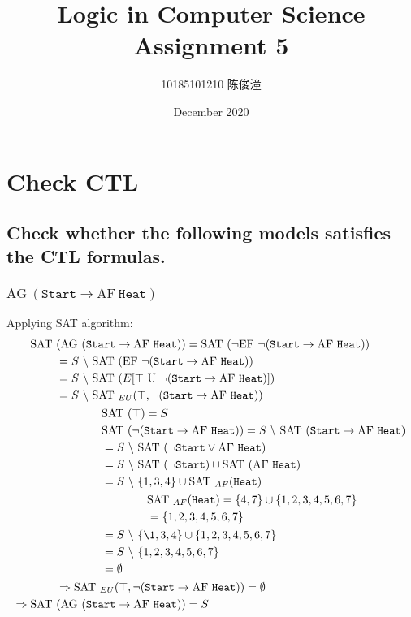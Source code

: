 \documentclass{ctexart}
\title{Logic in Computer Science Assignment 5}
\author{10185101210 陈俊潼}
\date{December 2020}
\def\n{\neg}
\def\SAT{\mathrm{SAT\ }}
\def\AF{\mathrm{AF\ }}
\def\AG{\mathrm{AG\ }}
\def\EF{\mathrm{EF\ }}
\def\U{\mathrm{\ U\ }}
\def\st{\texttt{Start}}
\def\he{\texttt{Heat}}
\def\bs{\ \backslash\ }
\begin{document}
\maketitle

\section{Check CTL}

\subsection{Check whether the following models satisfies the CTL formulas.}

\subsubsection{$\AG (\st \to \AF \he)$}

Applying SAT algorithm:
\begin{equation*}
\begin{split}
    \SAT& (\AG (\st \to \AF \he))
    = \SAT(\n \EF \n (\st \to \AF \he)) \\
    &= S \bs \SAT(\EF \n (\st \to \AF \he)) \\
    &= S \bs \SAT(E [\top \U \n (\st \to \AF \he)]) \\
    &= S \bs \SAT_{EU}(\top, \n (\st \to \AF \he)) \\
    & \qquad \qquad
    \begin{split}
        & \SAT(\top) = S \\
        & \SAT(\n (\st \to \AF \he)) = S \bs \SAT (\st \to \AF \he) \\
        & = S \bs \SAT (\n \st \vee \AF \he) \\
        & = S \bs \SAT(\n \st) \cup \SAT(\AF \he) \\
        & = S \bs \{1, 3, 4\} \cup \SAT_{AF}(\he) \\
        & \qquad \qquad
        \begin{split}
            & \SAT_{AF} (\he) = \{4, 7\} \cup \{1,2,3,4,5,6,7\} \\
            & = \{1,2,3,4,5,6,7\}
        \end{split}
        \\ & = S \bs \{\1,3,4\} \cup \{1,2,3,4,5,6,7\} \\
        & = S \bs \{1,2,3,4,5,6,7\} \\
        & = \emptyset\\
    \end{split}
    \\ & \Rightarrow \SAT_{EU}(\top, \n (\st \to \AF \he)) = \emptyset \\
    \Rightarrow \SAT & (\AG (\st \to \AF \he)) = S
\end{split}
\end{equation*}
\end{document}
